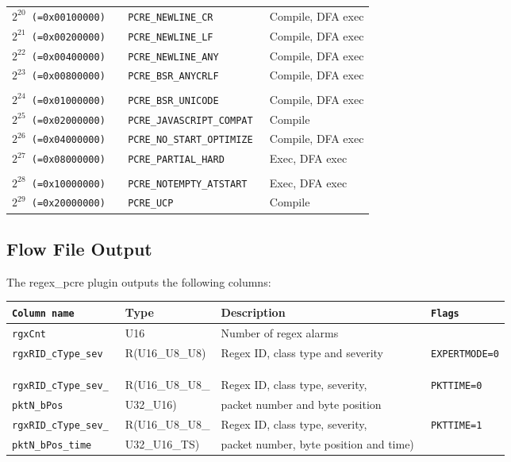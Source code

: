 \documentclass[documentation]{subfiles}
\begin{document}
\begin{longtable}{>{\tt}r>{\tt}ll}
    $2^{20}$ (=0x00100000) & PCRE\_NEWLINE\_CR         & Compile, DFA exec\\
    $2^{21}$ (=0x00200000) & PCRE\_NEWLINE\_LF         & Compile, DFA exec\\
    $2^{22}$ (=0x00400000) & PCRE\_NEWLINE\_ANY        & Compile, DFA exec\\
    $2^{23}$ (=0x00800000) & PCRE\_BSR\_ANYCRLF        & Compile, DFA exec\\
    \\
    $2^{24}$ (=0x01000000) & PCRE\_BSR\_UNICODE        & Compile, DFA exec\\
    $2^{25}$ (=0x02000000) & PCRE\_JAVASCRIPT\_COMPAT  & Compile\\
    $2^{26}$ (=0x04000000) & PCRE\_NO\_START\_OPTIMIZE & Compile, DFA exec\\
    $2^{27}$ (=0x08000000) & PCRE\_PARTIAL\_HARD       & Exec, DFA exec\\
    \\
    $2^{28}$ (=0x10000000) & PCRE\_NOTEMPTY\_ATSTART   & Exec, DFA exec\\
    $2^{29}$ (=0x20000000) & PCRE\_UCP                 & Compile\\
    \bottomrule
\end{longtable}

\subsection{Flow File Output}
The regex\_pcre plugin outputs the following columns:
\begin{longtable}{>{\tt}lll>{\tt\small}l}
    \toprule
    {\bf Column name} & {\bf Type} & {\bf Description} & {\bf Flags}\\
    \midrule\endhead%
    rgxCnt                  & U16                  & Number of regex alarms                        & \\
    rgxRID\_cType\_sev      & R(U16\_U8\_U8)       & Regex ID, class type and severity             & EXPERTMODE=0\\
    \\
    \multicolumn{4}{l}{If {\tt EXPERTMODE=1}, the following columns are displayed:}\\
    \\
    rgxRID\_cType\_sev\_    & R(U16\_U8\_U8\_      & Regex ID, class type, severity,               & PKTTIME=0\\
    \qquad pktN\_bPos       & \qquad U32\_U16)     & \qquad packet number and byte position        & \\
    rgxRID\_cType\_sev\_    & R(U16\_U8\_U8\_      & Regex ID, class type, severity,               & PKTTIME=1\\
    \qquad pktN\_bPos\_time & \qquad U32\_U16\_TS) & \qquad packet number, byte position and time) & \\
    \bottomrule
\end{longtable}
\end{document}
